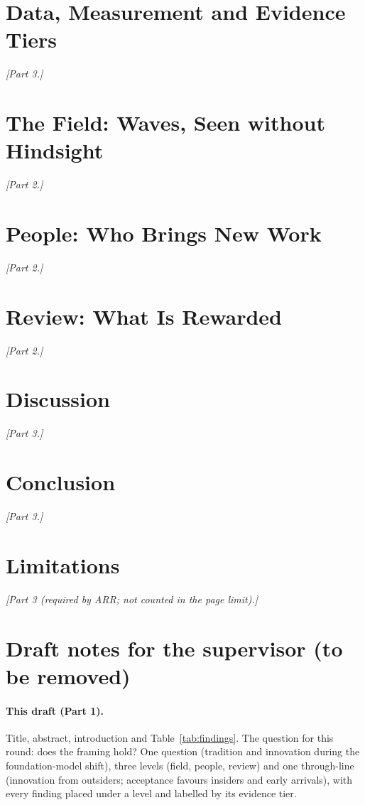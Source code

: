 \documentclass[11pt]{article}
\newcommand{\todo}[1]{\textit{[#1]}}
\begin{document}
\section{Data, Measurement and Evidence Tiers}
\label{sec:data}
\todo{Part 3.}

\section{The Field: Waves, Seen without Hindsight}
\label{sec:field}
\todo{Part 2.}

\section{People: Who Brings New Work}
\label{sec:people}
\todo{Part 2.}

\section{Review: What Is Rewarded}
\label{sec:review}
\todo{Part 2.}

\section{Discussion}
\todo{Part 3.}

\section{Conclusion}
\todo{Part 3.}

\section*{Limitations}
\todo{Part 3 (required by ARR; not counted in the page limit).}

\FloatBarrier


\appendix

\section*{Draft notes for the supervisor (to be removed)}

\paragraph{This draft (Part 1).} Title, abstract, introduction and Table~\ref{tab:findings}. The question for this
round: does the framing hold? One question (tradition and innovation during the foundation-model shift), three levels
(field, people, review) and one through-line (innovation from outsiders; acceptance favours insiders and early
arrivals), with every finding placed under a level and labelled by its evidence tier.
\end{document}
